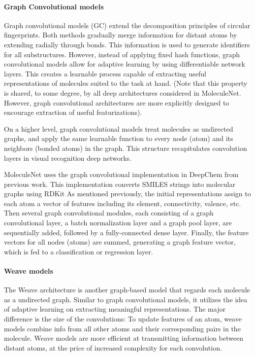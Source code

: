 \paragraph{Graph Convolutional models}

Graph convolutional models (GC) extend the decomposition principles of circular fingerprints. Both methods gradually merge information for distant atoms by extending radially through bonds. This information is used to generate identifiers for all substructures. However, instead of applying fixed hash functions, graph convolutional models allow for adaptive learning by using differentiable network layers. This creates a learnable process capable of extracting useful representations of molecules suited to the task at hand. (Note that this property is shared, to some degree, by all deep architectures considered in MoleculeNet. However, graph convolutional architectures are more explicitly designed to encourage extraction of useful featurizations).

On a higher level, graph convolutional models treat molecules as undirected graphs, and apply the same learnable function to every node (atom) and its neighbors (bonded atoms) in the graph. This structure recapitulates convolution layers in visual recognition deep networks.

MoleculeNet uses the graph convolutional implementation in DeepChem from previous work.\cite{altae2016low} This implementation converts SMILES strings into molecular graphs using RDKit \cite{RDKit} As mentioned previously, the initial representations assign to each atom a vector of features including its element, connectivity, valence, etc. Then several graph convolutional modules, each consisting of a graph convolutional layer, a batch normalization layer and a graph pool layer, are sequentially added, followed by a fully-connected dense layer. Finally, the feature vectors for all nodes (atoms) are summed, generating a graph feature vector, which is fed to a classification or regression layer.

\paragraph{Weave models}

The Weave architecture is another graph-based model that regards each molecule as a undirected graph. Similar to graph convolutional models, it utilizes the idea of adaptive learning on extracting meaningful representations.\cite{kearnes2016graphconv} The major difference is the size of the convolutions: To update features of an atom, weave models combine info from all other atoms and their corresponding pairs in the molecule. Weave models are more efficient at transmitting information between distant atoms, at the price of increased complexity for each convolution.

